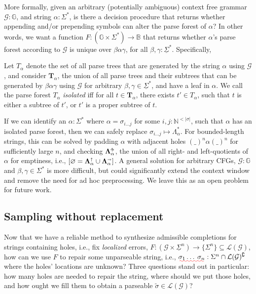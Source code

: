 \documentclass[sigplan,review,anonymous,acmsmall]{acmart}\settopmatter{printfolios=false,printccs=false,printacmref=false}
\begin{document}
More formally, given an arbitrary (potentially ambiguous) context free grammar $\mathcal{G}: \mathbb{G}$, and string $\alpha: \Sigma^*$, is there a decision procedure that returns whether appending and/or prepending symbols can alter the parse forest of $\alpha$? In other words, we want a function $F: (\mathbb{G} \times \Sigma^*) \rightarrow \mathbb{B}$ that returns whether $\alpha$'s parse forest according to $\mathcal{G}$ is unique over $\beta\alpha\gamma$, for all $\beta, \gamma: \underline\Sigma^*$. Specifically,

\begin{definition}[Isolation]
Let $T_\alpha$ denote the set of all parse trees that are generated by the string $\alpha$ using $\mathcal{G}$, and consider $\mathbf{T}_{\alpha}$, the union of all parse trees and their subtrees that can be generated by $\beta\alpha\gamma$ using $\mathcal{G}$ for arbitrary $\beta, \gamma \in \underline\Sigma^*$, and have a leaf in $\alpha$. We call the parse forest $T_\alpha$ \textit{isolated} iff for all $t \in \mathbf{T}_{\alpha}$, there exists $t' \in T_\alpha$, such that $t$ is either a subtree of $t'$, or $t'$ is a proper subtree of $t$.
\end{definition}

If we can identify an $\alpha: \Sigma^*$ where $\alpha = \sigma_{i\ldots j}$ for some $i, j: \mathbb{N}^{<|\sigma|}$, such that $\alpha$ has an isolated parse forest, then we can safely replace $\sigma_{i\ldots j} \mapsto \Lambda_\alpha^*$. For bounded-length strings, this can be solved by padding $\alpha$ with adjacent holes $(\_)^n\alpha(\_)^n$ for sufficiently large $n$, and checking $\bm\Lambda_{\alpha}^{\shortuparrow\hspace{-5pt}\shortrightarrow}$, the union of all right- and left-quotients of $\alpha$ for emptiness, i.e., $[\varnothing = \bm\Lambda_{\alpha}^\shortuparrow\cup\bm\Lambda_{\alpha}^\shortrightarrow]$. A general solution for arbitrary CFGs, $\mathcal{G}: \mathbb{G}$ and $\beta, \gamma \in \Sigma^*$ is more difficult, but could significantly extend the context window and remove the need for ad hoc preprocessing. We leave this as an open problem for future work.
%
%

\subsection{Sampling without replacement}\label{sec:dsi}

Now that we have a reliable method to synthesize admissible completions for strings containing holes, i.e., fix \textit{localized} errors, $F: (\mathcal{G} \times \underline\Sigma^n) \rightarrow \{\Sigma^n\}\subseteq \mathcal{L}(\mathcal{G})$, how can we use $F$ to repair some unparseable string, i.e., $\err{\sigma_1\ldots\:\sigma_n}: \Sigma^n \cap\mathcal{L}(\mathcal{G})^\complement$ where the holes' locations are unknown? Three questions stand out in particular: how many holes are needed to repair the string, where should we put those holes, and how ought we fill them to obtain a parseable $\tilde{\sigma} \in \mathcal{L}(\mathcal{G})$?
\end{document}
